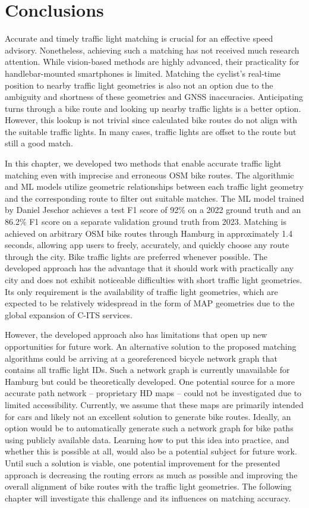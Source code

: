 \section{Conclusions}

Accurate and timely traffic light matching is crucial for an effective speed advisory. Nonetheless, achieving such a matching has not received much research attention. While vision-based methods are highly advanced, their practicality for handlebar-mounted smartphones is limited. Matching the cyclist's real-time position to nearby traffic light geometries is also not an option due to the ambiguity and shortness of these geometries and GNSS inaccuracies. Anticipating turns through a bike route and looking up nearby traffic lights is a better option. However, this lookup is not trivial since calculated bike routes do not align with the suitable traffic lights. In many cases, traffic lights are offset to the route but still a good match.

In this chapter, we developed two methods that enable accurate traffic light matching even with imprecise and erroneous OSM bike routes. The algorithmic and ML models utilize geometric relationships between each traffic light geometry and the corresponding route to filter out suitable matches. The ML model trained by Daniel Jeschor \cite{jeschor_2022} achieves a test F1 score of 92\% on a 2022 ground truth and an 86.2\% F1 score on a separate validation ground truth from 2023. Matching is achieved on arbitrary OSM bike routes through Hamburg in approximately 1.4 seconds, allowing app users to freely, accurately, and quickly choose any route through the city. Bike traffic lights are preferred whenever possible. The developed approach has the advantage that it should work with practically any city and does not exhibit noticeable difficulties with short traffic light geometries. Its only requirement is the availability of traffic light geometries, which are expected to be relatively widespread in the form of MAP geometries due to the global expansion of C-ITS services.

However, the developed approach also has limitations that open up new opportunities for future work. An alternative solution to the proposed matching algorithms could be arriving at a georeferenced bicycle network graph that contains all traffic light IDs. Such a network graph is currently unavailable for Hamburg \cite{neuner_leitfaden_2020} but could be theoretically developed. One potential source for a more accurate path network -- proprietary HD maps -- could not be investigated due to limited accessibility. Currently, we assume that these maps are primarily intended for cars and likely not an excellent solution to generate bike routes. Ideally, an option would be to automatically generate such a network graph for bike paths using publicly available data. Learning how to put this idea into practice, and whether this is possible at all, would also be a potential subject for future work. Until such a solution is viable, one potential improvement for the presented approach is decreasing the routing errors as much as possible and improving the overall alignment of bike routes with the traffic light geometries. The following chapter will investigate this challenge and its influences on matching accuracy.